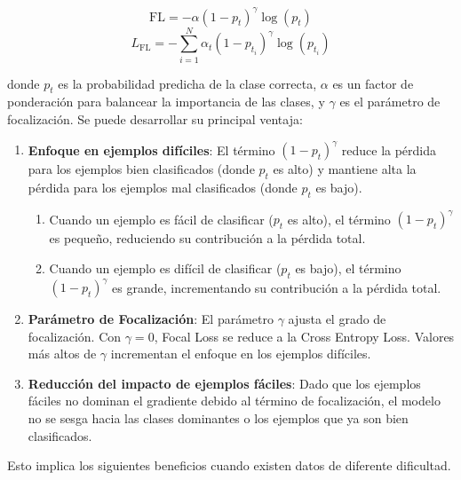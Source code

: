 $$ {\text{FL}} = - \alpha (1 - p_t)^\gamma \log(p_t) $$
$$ L_{\text{FL}} = - \sum_{i=1}^N \alpha_t (1 - p_{t_i})^\gamma \log(p_{t_i})$$

donde $p_t$ es la probabilidad predicha de la clase correcta, $\alpha$ es un factor de ponderación para balancear la importancia de las clases, y $\gamma$ es el parámetro de focalización. Se puede desarrollar su principal ventaja:

\begin{enumerate}
	\item \textbf{Enfoque en ejemplos difíciles}: El término $(1 - p_t)^\gamma$ reduce la pérdida para los ejemplos bien clasificados (donde $p_t$ es alto) y mantiene alta la pérdida para los ejemplos mal clasificados (donde $p_t$ es bajo).
	
	\begin{enumerate}
		\item Cuando un ejemplo es fácil de clasificar ($p_t$ es alto), el término $(1 - p_t)^\gamma$ es pequeño, reduciendo su contribución a la pérdida total.
		\item Cuando un ejemplo es difícil de clasificar ($p_t$ es bajo), el término $(1 - p_t)^\gamma$ es grande, incrementando su contribución a la pérdida total.
	\end{enumerate}
	
	\item \textbf{Parámetro de Focalización}: El parámetro $\gamma$ ajusta el grado de focalización. Con $\gamma=0$, Focal Loss se reduce a la Cross Entropy Loss. Valores más altos de $\gamma$ incrementan el enfoque en los ejemplos difíciles.
	
	\item \textbf{Reducción del impacto de ejemplos fáciles}: Dado que los ejemplos fáciles no dominan el gradiente debido al término de focalización, el modelo no se sesga hacia las clases dominantes o los ejemplos que ya son bien clasificados.
	
\end{enumerate}

Esto implica los siguientes beneficios cuando existen datos de diferente dificultad.

